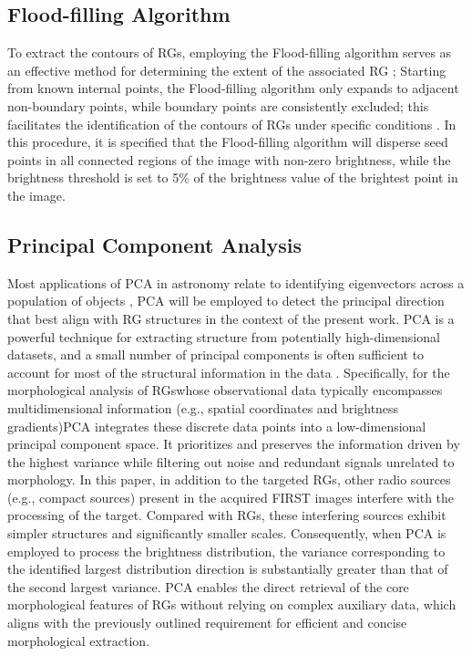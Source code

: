 \documentclass{aa}
\begin{document}
\subsection{Flood-filling Algorithm}\label{sec:Section3_3}
To extract the contours of RGs, employing the Flood-filling algorithm serves as an effective method for determining the extent of the associated RG \citep[e.g.,][]{mingo_revisiting_2019,hales_blobcat_2012}; Starting from known internal points, the Flood-filling algorithm only expands to adjacent non-boundary points, while boundary points are consistently excluded; this facilitates the identification of the contours of RGs under specific conditions \citep{lieberman_how_1978,fishkin_family_1984}. In this procedure, it is specified that the Flood-filling algorithm will disperse seed points in all connected regions of the image with non-zero brightness, while the brightness threshold is set to 5\% of the brightness value of the brightest point in the image.


\subsection{Principal Component Analysis}\label{sec:Section3_4}
Most applications of PCA in astronomy relate to identifying eigenvectors across a population of objects \citep[e.g., PCA tomography][]{steiner_pca_2009}, PCA will be employed to detect the principal direction that best align with RG structures in the context of the present work. PCA is a powerful technique for extracting structure from potentially high-dimensional datasets, and a small number of principal components is often sufficient to account for most of the structural information in the data \citep{hofmann_kernel_2008}. Specifically, for the morphological analysis of RGs\textemdash whose observational data typically encompasses multidimensional information (e.g., spatial coordinates and brightness gradients)\textemdash PCA integrates these discrete data points into a low-dimensional principal component space. It prioritizes and preserves the information driven by the highest variance while filtering out noise and redundant signals unrelated to morphology. In this paper, in addition to the targeted RGs, other radio sources (e.g., compact sources) present in the acquired FIRST images interfere with the processing of the target. Compared with RGs, these interfering sources exhibit simpler structures and significantly smaller scales. Consequently, when PCA is employed to process the brightness distribution, the variance corresponding to the identified largest distribution direction is substantially greater than that of the second largest variance. PCA enables the direct retrieval of the core morphological features of RGs without relying on complex auxiliary data, which aligns with the previously outlined requirement for efficient and concise morphological extraction.
\end{document}
